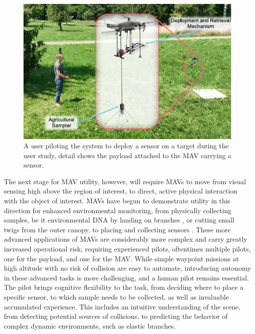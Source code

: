 \begin{figure}[!t]
\centering
\includegraphics[width=1\columnwidth]{chapters/papers/UR/figures/fig-1-summary/fig-1-summary.pdf}
\caption{A user piloting the system to deploy a sensor on a target during the user study, detail shows the payload attached to the \ac{MAV} carrying a sensor.}
\label{fig:fig1-summary}
\figurevspacebelow
\end{figure}

The next stage for \ac{MAV} utility, however, will require \acp{MAV} to move from visual sensing high above the region of interest, to direct, active physical interaction with the object of interest. \acp{MAV} have begun to demonstrate utility in this direction for enhanced environmental monitoring, from physically collecting samples, be it environmental DNA by landing on branches \cite{Aucone2023a}, or cutting small twigs from the outer canopy\cite{Charron2020}, to placing and collecting sensors \cite{Geckeler2023a, Hamaza}. These more advanced applications of \acp{MAV} are considerably more complex and carry greatly increased operational risk, requiring experienced pilots, oftentimes multiple pilots, one for the payload, and one for the MAV. While simple waypoint missions at high altitude with no risk of collision are easy to automate, introducing autonomy in these advanced tasks is more challenging, and a human pilot remains essential. The pilot brings cognitive flexibility to the task, from deciding where to place a specific sensor, to which sample needs to be collected, as well as invaluable accumulated experience. 
This includes an intuitive understanding of the scene, from detecting potential sources of collisions, to predicting the behavior of complex dynamic environments, such as elastic branches. 

